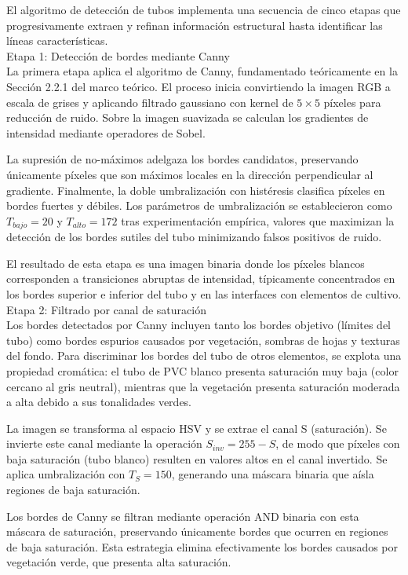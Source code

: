 El algoritmo de detección de tubos implementa una secuencia de cinco etapas que progresivamente extraen y refinan información estructural hasta identificar las líneas características.\\

Etapa 1: Detección de bordes mediante Canny \\
\noindent
La primera etapa aplica el algoritmo de Canny, fundamentado teóricamente en la Sección 2.2.1 del marco teórico. El proceso inicia convirtiendo la imagen RGB a escala de grises y aplicando filtrado gaussiano con kernel de $5 \times 5$ píxeles para reducción de ruido. Sobre la imagen suavizada se calculan los gradientes de intensidad mediante operadores de Sobel.

La supresión de no-máximos adelgaza los bordes candidatos, preservando únicamente píxeles que son máximos locales en la dirección perpendicular al gradiente. Finalmente, la doble umbralización con histéresis clasifica píxeles en bordes fuertes y débiles. Los parámetros de umbralización se establecieron como $T_{bajo} = 20$ y $T_{alto} = 172$ tras experimentación empírica, valores que maximizan la detección de los bordes sutiles del tubo minimizando falsos positivos de ruido.

El resultado de esta etapa es una imagen binaria donde los píxeles blancos corresponden a transiciones abruptas de intensidad, típicamente concentrados en los bordes superior e inferior del tubo y en las interfaces con elementos de cultivo.\\

Etapa 2: Filtrado por canal de saturación\\
\noindent
Los bordes detectados por Canny incluyen tanto los bordes objetivo (límites del tubo) como bordes espurios causados por vegetación, sombras de hojas y texturas del fondo. Para discriminar los bordes del tubo de otros elementos, se explota una propiedad cromática: el tubo de PVC blanco presenta saturación muy baja (color cercano al gris neutral), mientras que la vegetación presenta saturación moderada a alta debido a sus tonalidades verdes.

La imagen se transforma al espacio HSV y se extrae el canal S (saturación). Se invierte este canal mediante la operación $S_{inv} = 255 - S$, de modo que píxeles con baja saturación (tubo blanco) resulten en valores altos en el canal invertido. Se aplica umbralización con $T_S = 150$, generando una máscara binaria que aísla regiones de baja saturación.

Los bordes de Canny se filtran mediante operación AND binaria con esta máscara de saturación, preservando únicamente bordes que ocurren en regiones de baja saturación. Esta estrategia elimina efectivamente los bordes causados por vegetación verde, que presenta alta saturación.\\

